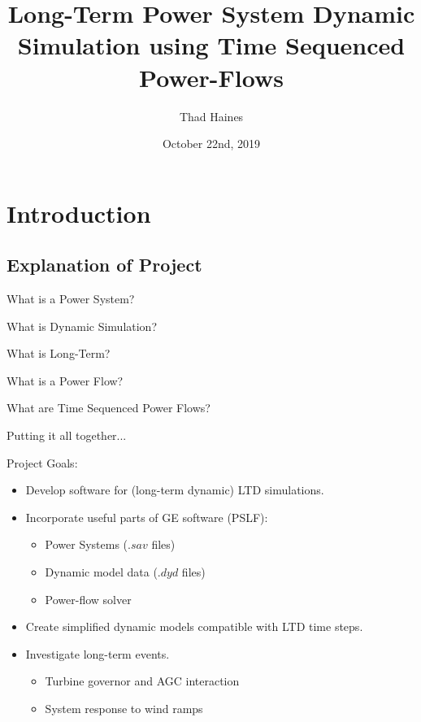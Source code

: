 \documentclass[14pt, unknownkeysallowed]{beamer}
\title{Long-Term Power System Dynamic Simulation using Time Sequenced Power-Flows}
\author{Thad Haines}
\institute[MT TECH]{Montana Technological University - Master's Thesis Research Project}
\date{October 22nd, 2019}
\begin{document}
	
\begin{frame}
	\titlepage
\end{frame}

\section{Introduction}
\subsection{Explanation of Project}
\begin{frame}
What is a Power System?
\end{frame}
\begin{frame}
What is Dynamic Simulation?
\end{frame}
\begin{frame}
What is Long-Term?
\end{frame}
\begin{frame}
What is a Power Flow?
\end{frame}
\begin{frame}
What are Time Sequenced Power Flows?
\end{frame}
\begin{frame}
Putting it all together...
\end{frame}
\begin{frame}
Project Goals:
\begin{itemize}
\item Develop software for (long-term dynamic) LTD simulations.
\item Incorporate useful parts of GE software (PSLF):
\begin{itemize}
	\item Power Systems ($.sav$ files)
	\item Dynamic model data ($.dyd$ files)
	\item Power-flow solver
\end{itemize}
\item Create simplified dynamic models compatible with LTD time steps.
\item Investigate long-term events.
\begin{itemize}
	\item Turbine governor and AGC interaction
	\item System response to wind ramps
\end{itemize}
\end{itemize}
\end{frame}
\end{document}
